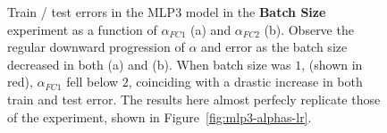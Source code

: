 \begin{figure}[t] %
    \centering

    \caption{
            Train / test errors in the MLP3 model in the {\bf Batch Size} experiment as a function of $\alpha_{FC1}$ 
            (a) and $\alpha_{FC2}$ (b). Observe the regular downward progression of $\alpha$ and error as the batch size
            decreased in both (a) and (b). When batch size was $1$, (shown in red), $\alpha_{FC1}$ fell below $2$, 
            coinciding with a drastic increase in both train and test error. The results here almost perfecly 
            replicate those of the \LearningRate experiment, shown in Figure~\ref{fig:mlp3-alphas-lr}.
    }
 \label{fig:mlp3-alphas-bs}
\end{figure}




